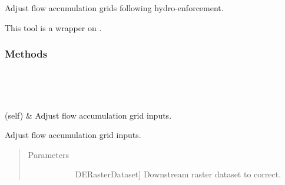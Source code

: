 \documentclass[letterpaper,10pt,english]{sphinxmanual}
\begin{document}
\begin{fulllineitems}
\label{\detokenize{StreamStats_DataPrep:StreamStats_DataPrep.AdjustAccum}}
Adjust flow accumulation grids following hydro-enforcement.

This tool is a wrapper on {\hyperref[\detokenize{make_hydrodem:make_hydrodem.adjust_accum}]{}}.
\subsubsection*{Methods}


\begin{savenotes}\sphinxatlongtablestart\begin{longtable}{}
\hline

\endfirsthead

%
{}\\
\hline

\endhead

\hline
{}\\
\endfoot

\endlastfoot

{\hyperref[\detokenize{StreamStats_DataPrep:StreamStats_DataPrep.AdjustAccum.getParameterInfo}]{}}(self)
&
Adjust flow accumulation grid inputs.
\\
\hline
\end{longtable}\sphinxatlongtableend\end{savenotes}

\begin{fulllineitems}
\label{\detokenize{StreamStats_DataPrep:StreamStats_DataPrep.AdjustAccum.getParameterInfo}}
Adjust flow accumulation grid inputs.
\begin{quote}\begin{description}
\item[{Parameters}] \leavevmode\begin{description}
\item[{}] \leavevmode{[}DERasterDataset{]}
Downstream raster dataset to correct.


\end{description}
\end{description}
\end{quote}
\end{fulllineitems}
\end{fulllineitems}
\end{document}
